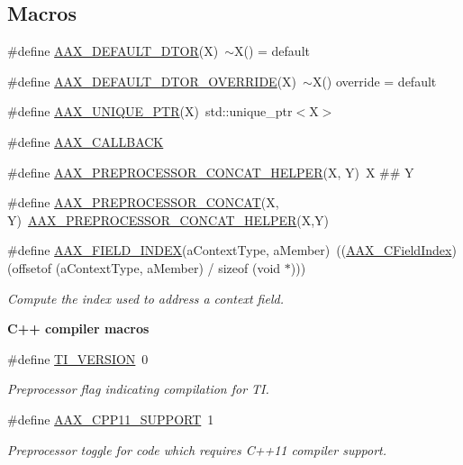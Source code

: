 \subsection*{Macros}
\begin{DoxyCompactItemize}
\item 
\#define \mbox{\hyperlink{a00392_aa2e8b7a189710394388ad3b0a782de86}{A\+A\+X\+\_\+\+D\+E\+F\+A\+U\+L\+T\+\_\+\+D\+T\+OR}}(X)~$\sim$X() = default
\item 
\#define \mbox{\hyperlink{a00392_a2cb0270bc94e260696e62749de215798}{A\+A\+X\+\_\+\+D\+E\+F\+A\+U\+L\+T\+\_\+\+D\+T\+O\+R\+\_\+\+O\+V\+E\+R\+R\+I\+DE}}(X)~$\sim$X() override = default
\item 
\#define \mbox{\hyperlink{a00392_a0a58bb9dab931dfe26d8edeb4e5e6319}{A\+A\+X\+\_\+\+U\+N\+I\+Q\+U\+E\+\_\+\+P\+TR}}(X)~std\+::unique\+\_\+ptr$<$X$>$
\item 
\#define \mbox{\hyperlink{a00392_aaa22112139aa627574b1ef562f579d43}{A\+A\+X\+\_\+\+C\+A\+L\+L\+B\+A\+CK}}
\item 
\#define \mbox{\hyperlink{a00392_ab4f95cd2e83b3c871f47c24a4fbaae7a}{A\+A\+X\+\_\+\+P\+R\+E\+P\+R\+O\+C\+E\+S\+S\+O\+R\+\_\+\+C\+O\+N\+C\+A\+T\+\_\+\+H\+E\+L\+P\+ER}}(X,  Y)~X \#\# Y
\item 
\#define \mbox{\hyperlink{a00392_af135db633628741ce84c57c6ee8dd1ce}{A\+A\+X\+\_\+\+P\+R\+E\+P\+R\+O\+C\+E\+S\+S\+O\+R\+\_\+\+C\+O\+N\+C\+AT}}(X,  Y)~\mbox{\hyperlink{a00392_ab4f95cd2e83b3c871f47c24a4fbaae7a}{A\+A\+X\+\_\+\+P\+R\+E\+P\+R\+O\+C\+E\+S\+S\+O\+R\+\_\+\+C\+O\+N\+C\+A\+T\+\_\+\+H\+E\+L\+P\+ER}}(X,Y)
\item 
\#define \mbox{\hyperlink{a00392_acf807247ecd6e5899dc9dc31644e9a1d}{A\+A\+X\+\_\+\+F\+I\+E\+L\+D\+\_\+\+I\+N\+D\+EX}}(a\+Context\+Type,  a\+Member)~((\mbox{\hyperlink{a00392_ae807f8986143820cfb5d6da32165c9c7}{A\+A\+X\+\_\+\+C\+Field\+Index}}) (offsetof (a\+Context\+Type, a\+Member) / sizeof (void $\ast$)))
\begin{DoxyCompactList}\small\item\em Compute the index used to address a context field. \end{DoxyCompactList}\end{DoxyCompactItemize}
\begin{Indent}\textbf{ C++ compiler macros}\par
\begin{DoxyCompactItemize}
\item 
\#define \mbox{\hyperlink{a00392_a5f58f7770d463d262cc28b0e7b88747b}{T\+I\+\_\+\+V\+E\+R\+S\+I\+ON}}~0
\begin{DoxyCompactList}\small\item\em Preprocessor flag indicating compilation for TI. \end{DoxyCompactList}\item 
\#define \mbox{\hyperlink{a00392_a2da185ff8aad77278f985a6fe5ee07ba}{A\+A\+X\+\_\+\+C\+P\+P11\+\_\+\+S\+U\+P\+P\+O\+RT}}~1
\begin{DoxyCompactList}\small\item\em Preprocessor toggle for code which requires C++11 compiler support. \end{DoxyCompactList}\end{DoxyCompactItemize}
\end{Indent}

